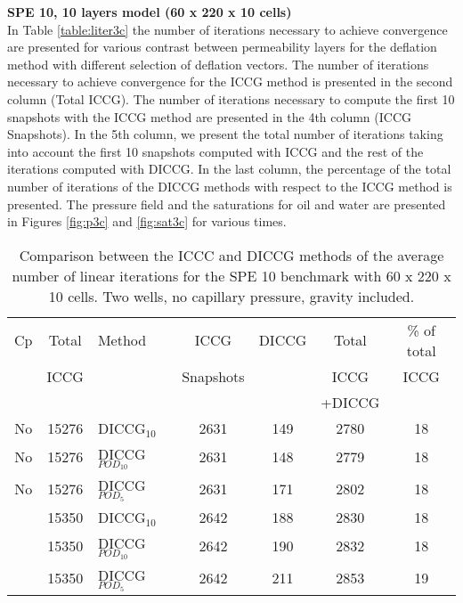 \documentclass[12pt]{article}
\begin{document}
\newpage
\textbf{SPE 10, 10 layers model (60 x 220 x 10 cells)}\\
In Table \ref{table:liter3c} the number of iterations necessary to achieve convergence are presented for various contrast between permeability layers for the deflation method with different selection of deflation vectors. The number of iterations necessary to achieve convergence for the ICCG method is presented in the second column (Total ICCG). The number of iterations necessary to compute the first 10 snapshots with the ICCG method are presented in the 4th column (ICCG Snapshots). In the 5th column, we present the total number of iterations taking into account the first 10 snapshots computed with ICCG and the rest of the iterations computed with DICCG. In the last column, the percentage of the total number of iterations of the DICCG methods with respect to the ICCG method is presented.   
The pressure field and the saturations for oil and water are presented in Figures \ref{fig:p3c} and \ref{fig:sat3c} for various times.
\begin{table}[!h]\centering
\begin{minipage}{1\textwidth}
 \centering
\begin{tabular}{ ||c|c||l|c|c|c|c||} 
\hline
Cp&Total&Method  & ICCG&DICCG &Total&\% of total\\ 
                           & ICCG     &  & Snapshots& &ICCG& ICCG\\ 
                            &     &  & & &+DICCG& \\
\hline 
No &15276& DICCG$_{10}$&2631&149&2780&18\\ 
\hline  
No &15276& DICCG$_{POD_{10}}$&2631&148&2779&18 \\ 
\hline  
No &15276& DICCG$_{POD_{5}}$&2631&171&2802&18 \\ 
\hline  
 &15350& DICCG$_{10}$&2642&188&2830&18\\ 
\hline  
 &15350& DICCG$_{POD_{10}}$&2642&190&2832&18 \\ 
\hline  
&15350& DICCG$_{POD_{5}}$&2642&211&2853&19 \\ 
\hline 
\end{tabular} 
\caption{Comparison between the ICCC and DICCG methods of the average number of linear iterations for the SPE 10 benchmark with 60 x 220 x 10 cells. Two wells, no capillary pressure, gravity included.}\label{table:literspe1} 
\end{minipage}  
\end{table}  
\end{document}
